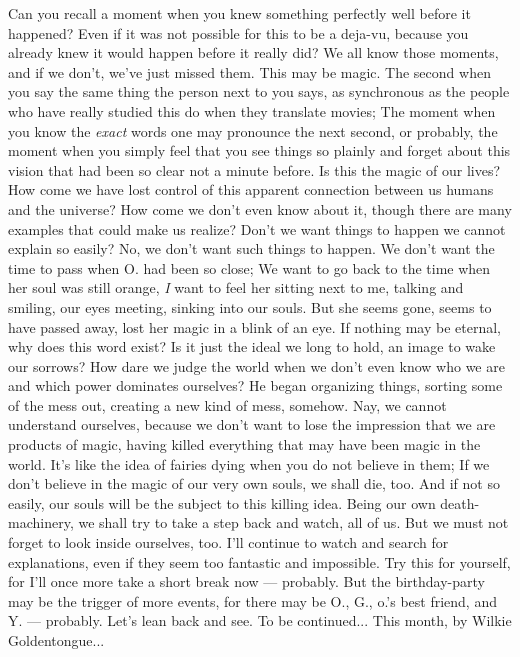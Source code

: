 Can you recall a moment when you knew something perfectly well before it happened? Even if it was not possible for this to be a deja-vu, because you already knew it would happen before it really did? 
We all know those moments, and if we don't, we've just missed them. This may be magic. 
The second when you say the same thing the person next to you says, as synchronous as the people who have really studied this do when they translate movies; The moment when you know the \emph{exact} words one may pronounce the next second, or probably, the moment when you simply feel that you see things so plainly and forget about this vision that had been so clear not a minute before. 
Is this the magic of our lives? How come we have lost control of this apparent connection between us humans and the universe? 
How come we don't even know about it, though there are many examples that could make us realize? Don't we want things to happen we cannot explain so easily? 
No, we don't want such things to happen. We don't want the time to pass when O. had been so close; We want to go back to the time when her soul was still orange, \emph{I} want to feel her sitting next to me, talking and smiling, our eyes meeting, sinking into our souls. But she seems gone, seems to have passed away, lost her magic in a blink of an eye. 
If nothing may be eternal, why does this word exist? Is it just the ideal we long to hold, an image to wake our sorrows? 
How dare we judge the world when we don't even know who we are and which power dominates ourselves? 
He began organizing things, sorting some of the mess out, creating a new kind of mess, somehow. Nay, we cannot understand ourselves, because we don't want to lose the impression that we are products of magic, having killed everything that may have been magic in the world. It's like the idea of fairies dying when you do not believe in them; If we don't believe in the magic of our very own souls, we shall die, too. 
And if not so easily, our souls will be the subject to this killing idea. 
Being our own death-machinery, we shall try to take a step back and watch, all of us. But we must not forget to look inside ourselves, too. 
I'll continue to watch and search for explanations, even if they seem too fantastic and impossible. Try this for yourself, for I'll once more take a short break now --- probably. But the birthday-party may be the trigger of more events, for there may be O., G., o.'s best friend, and Y. --- probably. Let's lean back and see. 
To be continued...
This month, by Wilkie Goldentongue...

